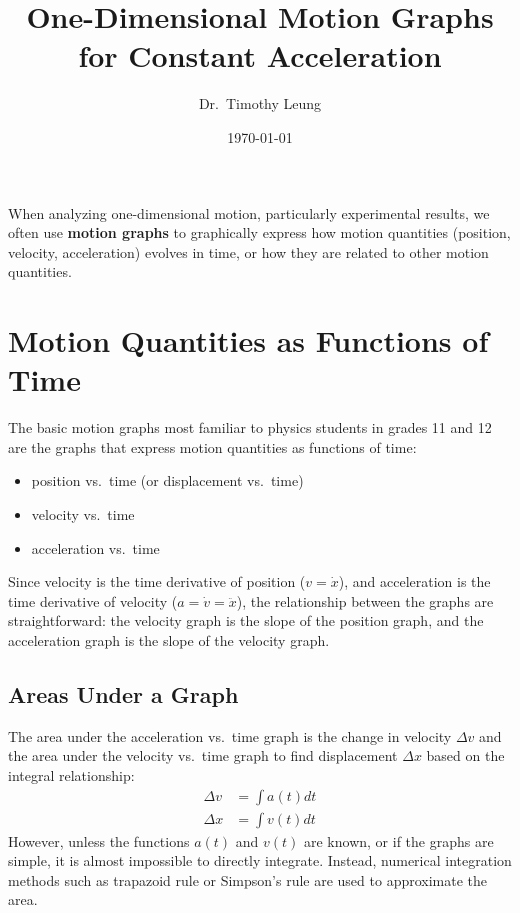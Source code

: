 \documentclass{../../oss-handout}
\title{One-Dimensional Motion Graphs for Constant Acceleration}
\author{Dr.\ Timothy Leung}
\date{\today}
\begin{document}
\thispagestyle{title}
\gentitle

When analyzing one-dimensional motion, particularly experimental results, we
often use \textbf{motion graphs} to graphically express how motion quantities
(position, velocity, acceleration) evolves in time, or how they are related to
other motion quantities.

\section{Motion Quantities as Functions of Time}

The basic motion graphs most familiar to physics students in grades 11 and 12
are the graphs that express motion quantities as functions of time:
\begin{itemize}[nosep,leftmargin=15pt]
\item position vs.\ time (or displacement vs.\ time)
\item velocity vs.\ time
\item acceleration vs.\ time
\end{itemize}
Since velocity is the time derivative of position ($v=\dot{x}$), and
acceleration is the time derivative of velocity ($a=\dot{v}=\ddot{x}$), the
relationship between the graphs are straightforward: the velocity graph is the
slope of the position graph, and the acceleration graph is the slope of the
velocity graph.

\subsection{Areas Under a Graph}
The area under the acceleration vs.\ time graph is the change in velocity
$\Delta v$ and the area under the velocity vs.\ time graph to find displacement
$\Delta x$ based on the integral relationship:
\begin{align*}
 \Delta v&=\int a(t)dt\\
 \Delta x&=\int v(t)dt
\end{align*}
However, unless the functions $a(t)$ and $v(t)$ are known, or if the
graphs are simple, it is almost impossible to directly integrate. Instead,
numerical integration methods such as trapazoid rule or Simpson's rule are used
to approximate the area.
\end{document}

